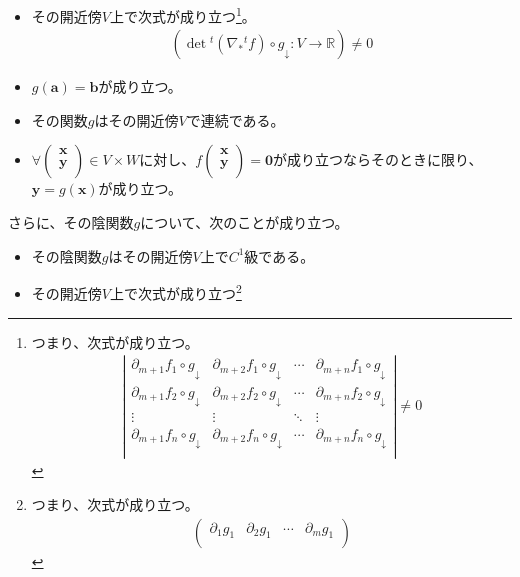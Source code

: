 \documentclass[dvipdfmx]{jsarticle}
\begin{document}
\begin{thm}[よりよい陰関数定理]
\begin{itemize}
\item
  その開近傍$V$上で次式が成り立つ\footnote{つまり、次式が成り立つ。
\begin{align*}
\left| 
  \begin{matrix}
    \partial_{m + 1}f_{1} \circ g_{\downarrow} & \partial_{m + 2}f_{1} \circ g_{\downarrow} & \cdots & \partial_{m + n}f_{1} \circ g_{\downarrow} \\
    \partial_{m + 1}f_{2} \circ g_{\downarrow} & \partial_{m + 2}f_{2} \circ g_{\downarrow} & \cdots & \partial_{m + n}f_{2} \circ g_{\downarrow} \\
    \vdots & \vdots & \ddots & \vdots \\
    \partial_{m + 1}f_{n} \circ g_{\downarrow} & \partial_{m + 2}f_{n} \circ g_{\downarrow} & \cdots & \partial_{m + n}f_{n} \circ g_{\downarrow} \\
  \end{matrix}
\right| \neq 0
\end{align*} }。
\begin{align*}
\left( \det{{}^{t}\left( \nabla_{*}{}^{t}f \right)} \circ g_{\downarrow}:V \rightarrow \mathbb{R} \right) \neq 0
\end{align*}
\item
  $g\left( \mathbf{a} \right) = \mathbf{b}$が成り立つ。
\item
  その関数$g$はその開近傍$V$で連続である。
\item
  $\forall\begin{pmatrix}
  \mathbf{x} \\
  \mathbf{y} \\
  \end{pmatrix} \in V \times W$に対し、$f\begin{pmatrix}
  \mathbf{x} \\
  \mathbf{y} \\
  \end{pmatrix} = \mathbf{0}$が成り立つならそのときに限り、$\mathbf{y} = g\left( \mathbf{x} \right)$が成り立つ。
\end{itemize}
さらに、その陰関数$g$について、次のことが成り立つ。
\begin{itemize}
\item
  その陰関数$g$はその開近傍$V$上で$C^{1}$級である。
\item
  その開近傍$V$上で次式が成り立つ\footnote{つまり、次式が成り立つ。
\begin{align*}
\begin{pmatrix}
  \partial_{1}g_{1} & \partial_{2}g_{1} & \cdots & \partial_{m}g_{1} \\

\end{pmatrix}
\end{align*}}
\end{itemize}
\end{thm}
\end{document}
